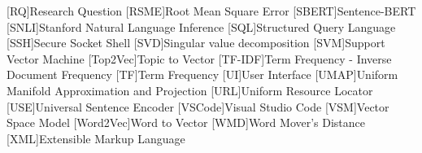 \begin{acronym}[XXXXXXXXX]
    [RQ]{Research Question}
    [RSME]{Root Mean Square Error}
    [SBERT]{Sentence-BERT}
    [SNLI]{Stanford Natural Language Inference}
    [SQL]{Structured Query Language}
    [SSH]{Secure Socket Shell}
    [SVD]{Singular value decomposition}
    [SVM]{Support Vector Machine}
    [Top2Vec]{Topic to Vector}
    [TF-IDF]{Term Frequency - Inverse Document Frequency}
    [TF]{Term Frequency}
    [UI]{User Interface}
    [UMAP]{Uniform Manifold Approximation and Projection}
    [URL]{Uniform Resource Locator}
    [USE]{Universal Sentence Encoder}
    [VSCode]{Visual Studio Code}
    [VSM]{Vector Space Model}
    [Word2Vec]{Word to Vector}
    [WMD]{Word Mover's Distance}
    [XML]{Extensible Markup Language}
\end{acronym}
